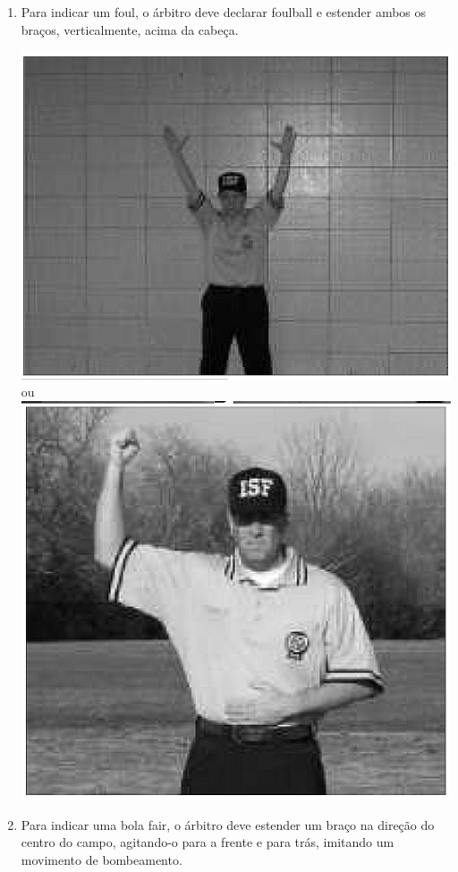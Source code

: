 \begin{enumerate}[label=(\alph*)]
	\item Para indicar um \gls{foul}, o árbitro deve declarar \gls{foulball} e estender ambos os braços, verticalmente, acima da cabeça.

	\includegraphics[height=.20\textheight]{fig/sinais/fair-foul-b} ou
	\includegraphics[height=.20\textheight]{fig/sinais/fair-foul-c}

	\item Para indicar uma bola \gls{fair}, o árbitro deve estender um braço na direção do centro do campo, agitando-o para a frente e para trás, imitando um movimento de bombeamento.


\end{enumerate}
